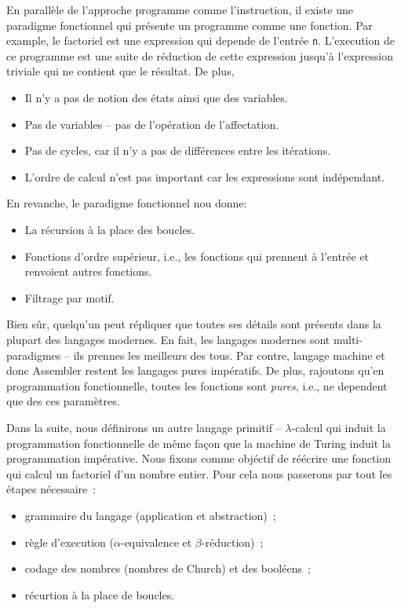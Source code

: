 En parallèle de l'approche programme comme l'instruction, il existe une paradigme fonctionnel qui présente un programme comme une fonction.
Par example, le factoriel est une expression qui depende de l'entrée \verb|n|.
L'execution de ce programme est une suite de réduction de cette expression jusqu'à l'expression triviale qui ne contient que le résultat.
De plus,
\begin{itemize}
	\item Il n'y a pas de notion des états ainsi que des variables.
	\item Pas de variables -- pas de l'opération de l'affectation.
	\item Pas de cycles, car il n'y a pas de différences entre les itérations.
	\item L'ordre de calcul n'est pas important car les expressions sont indépendant.
\end{itemize}
En revanche, le paradigme fonctionnel nou donne:
\begin{itemize}
	\item La récursion à la place des boucles.
	\item Fonctions d'ordre supérieur, i.e., les fonctions qui prennent à l'entrée et renvoient autres fonctions.
	\item Filtrage par motif.
\end{itemize}
Bien sûr, quelqu'un peut répliquer que toutes ses détails sont présents dans la plupart des langages modernes.
En fait, les langages modernes sont multi-paradigmes -- ils prennes les meilleurs des tous.
Par contre, langage machine et donc Assembler restent les langages pures impératifs.
De plus, rajoutons qu'en programmation fonctionnelle, toutes les fonctions sont \emph{pures}, i.e., ne dependent que des ces paramètres.


Dans la suite, nous définirons un autre langage primitif -- $\lambda$-calcul qui induit la programmation fonctionnelle de même façon que la machine de Turing induit la programmation impérative.
Nous fixons comme objéctif de réécrire une fonction qui calcul un factoriel d'un nombre entier.
Pour cela nous passerons par tout les étapes nécessaire~:
\begin{itemize}
	\item grammaire du langage (application et abstraction)~;
	\item règle d'execution ($\alpha$-equivalence et $\beta$-réduction)~;
	\item codage des nombres (nombres de Church) et des booléens~;
	\item récurtion à la place de boucles.
\end{itemize}

